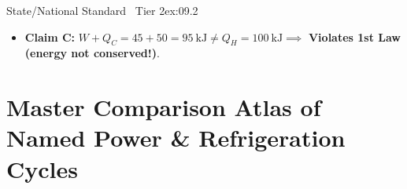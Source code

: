\begin{workedexample}{State/National Standard \textbar\ Tier 2}{ex:09.2}
\begin{enumerate}
\begin{itemize}
    \item \textbf{Claim C:} $W + Q_C = 45 + 50 = \SI{95}{\kilo\joule} \ne Q_H = \SI{100}{\kilo\joule} \implies$ \textbf{Violates 1st Law (energy not conserved!)}.
  \end{itemize}
\end{enumerate}
\end{workedexample}

\section{Master Comparison Atlas of Named Power \& Refrigeration Cycles}\label{sec:09.3}

